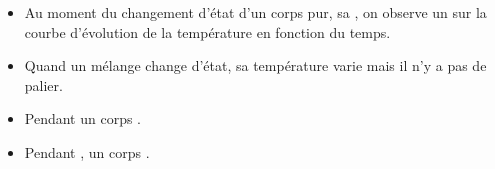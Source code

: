 \begin{mybilan}
	\begin{itemize}
		\item Au moment du changement d'état d'un corps pur, sa , on observe un  sur la courbe d'évolution de la température en fonction du temps.
		\item Quand un mélange change d'état, sa température varie mais il n'y a pas de palier.
		\item Pendant  un corps .
		\item Pendant , un corps .
	\end{itemize}


\end{mybilan}